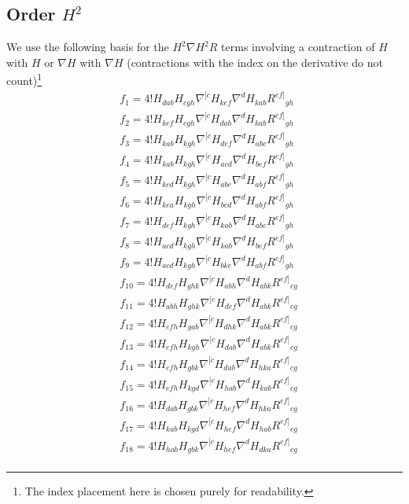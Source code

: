 \documentclass[a4paper,11pt]{article}
\begin{document}
\subsection{Order \texorpdfstring{$H^2$}{H**2}}
We use the following basis for the $H^2\nabla H^2R$ terms involving a contraction of $H$ with $H$ or $\nabla H$ with $\nabla H$ (contractions with the index on the derivative do not count)\footnote{The index placement here is chosen purely for readability.}
\begin{equation}
\begin{aligned}
&f_1=4!H_{dab}H_{cgh}\nabla^{[c}H_{kef}\nabla^dH_{kab}R^{ef]}{}_{gh}\\
&f_2=4!H_{kef}H_{cgh}\nabla^{[c}H_{dab}\nabla^dH_{kab}R^{ef]}{}_{gh}\\
&f_3=4!H_{kab}H_{kgh}\nabla^{[c}H_{def}\nabla^dH_{abc}R^{ef]}{}_{gh}\\
&f_4=4!H_{kab}H_{kgh}\nabla^{[c}H_{acd}\nabla^dH_{bef}R^{ef]}{}_{gh}\\
&f_5=4!H_{kcd}H_{kgh}\nabla^{[c}H_{abe}\nabla^dH_{abf}R^{ef]}{}_{gh}\\
&f_6=4!H_{kea}H_{kgh}\nabla^{[c}H_{bcd}\nabla^dH_{abf}R^{ef]}{}_{gh}\\
&f_7=4!H_{def}H_{kgh}\nabla^{[c}H_{kab}\nabla^dH_{abc}R^{ef]}{}_{gh}\\
&f_8=4!H_{acd}H_{kgh}\nabla^{[c}H_{kab}\nabla^dH_{bef}R^{ef]}{}_{gh}\\
&f_9=4!H_{acd}H_{kgh}\nabla^{[c}H_{bke}\nabla^dH_{abf}R^{ef]}{}_{gh}\\
%
&f_{10}=4!H_{def}H_{ghk}\nabla^{[c}H_{abh}\nabla^dH_{abk}R^{ef]}{}_{cg}\\
&f_{11}=4!H_{abh}H_{ghk}\nabla^{[c}H_{def}\nabla^dH_{abk}R^{ef]}{}_{cg}\\
&f_{12}=4!H_{efh}H_{gab}\nabla^{[c}H_{dhk}\nabla^dH_{abk}R^{ef]}{}_{cg}\\
&f_{13}=4!H_{efh}H_{kgh}\nabla^{[c}H_{dab}\nabla^dH_{abk}R^{ef]}{}_{cg}\\
&f_{14}=4!H_{efh}H_{gbk}\nabla^{[c}H_{dab}\nabla^dH_{hka}R^{ef]}{}_{cg}\\
&f_{15}=4!H_{efh}H_{kgd}\nabla^{[c}H_{hab}\nabla^dH_{kab}R^{ef]}{}_{cg}\\
&f_{16}=4!H_{dab}H_{gbk}\nabla^{[c}H_{hef}\nabla^dH_{hka}R^{ef]}{}_{cg}\\
&f_{17}=4!H_{kab}H_{kgd}\nabla^{[c}H_{hef}\nabla^dH_{hab}R^{ef]}{}_{cg}\\
&f_{18}=4!H_{hab}H_{gbk}\nabla^{[c}H_{hef}\nabla^dH_{dka}R^{ef]}{}_{cg}\\

\end{aligned}
\end{equation}
\end{document}
